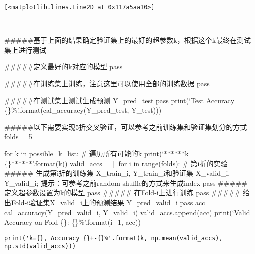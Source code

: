\documentclass[11pt]{article}
\makeatletter
\newcommand{\boxspacing}{\kern\kvtcb@left@rule\kern\kvtcb@boxsep}
\newcommand{\prompt}[4]{
        {\ttfamily\llap{{\color{#2}[#3]:\hspace{3pt}#4}}\vspace{-\baselineskip}}
    }
\makeatother
\begin{document}
            \begin{tcolorbox}[breakable, size=fbox, boxrule=.5pt, pad at break*=1mm, opacityfill=0]
\prompt{Out}{outcolor}{64}{\boxspacing}
\begin{Verbatim}[commandchars=\\\{\}]
[<matplotlib.lines.Line2D at 0x117a5aa10>]
\end{Verbatim}
\end{tcolorbox}
        
    \begin{center}
    \end{center}
    { \hspace*{\fill} \\}
    
    \#\#\#\#\#基于上面的结果确定验证集上的最好的超参数k，根据这个k最终在测试集上进行测试

\#\#\#\#\#定义最好的k对应的模型 pass

\#\#\#\#\#在训练集上训练，注意这里可以使用全部的训练数据 pass

\#\#\#\#\#在测试集上测试生成预测 Y\_pred\_test pass print(`Test
Accuracy=\{\}\%'.format(cal\_accuracy(Y\_pred\_test, Y\_test)))

    \#\#\#\#\#以下需要实现5折交叉验证，可以参考之前训练集和验证集划分的方式
folds = 5

for k in possible\_k\_list: \# 遍历所有可能的k
print(`******k=\{\}******'.format(k)) valid\_accs = {[}{]} for i in
range(folds): \# 第i折的实验 \#\#\#\#\# 生成第i折的训练集 X\_train\_i,
Y\_train\_i和验证集 X\_valid\_i, Y\_valid\_i; 提示：可参考之前random
shuffle的方式来生成index pass \#\#\#\#\# 定义超参数设置为k的模型 pass
\#\#\#\#\# 在Fold-i上进行训练 pass \#\#\#\#\#
给出Fold-i验证集X\_valid\_i上的预测结果 Y\_pred\_valid\_i pass acc =
cal\_accuracy(Y\_pred\_valid\_i, Y\_valid\_i) valid\_accs.append(acc)
print(`Valid Accuracy on Fold-\{\}: \{\}\%'.format(i+1, acc))

\begin{verbatim}
print('k={}, Accuracy {}+-{}%'.format(k, np.mean(valid_accs), np.std(valid_accs)))
\end{verbatim}
\end{document}
